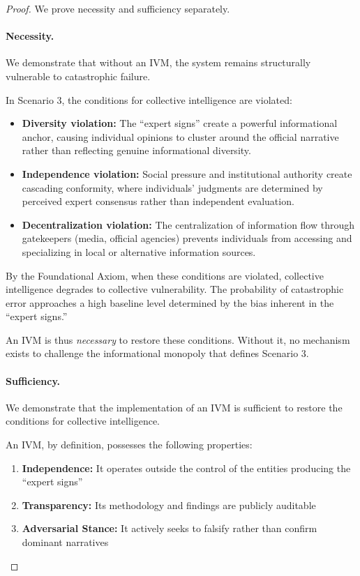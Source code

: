 \documentclass[11pt,a4paper]{article}
\begin{document}
\begin{proof}
We prove necessity and sufficiency separately.

\paragraph{Necessity.} We demonstrate that without an IVM, the system remains structurally vulnerable to catastrophic failure.

In Scenario 3, the conditions for collective intelligence are violated:
\begin{itemize}
    \item \textbf{Diversity violation:} The ``expert signs'' create a powerful informational anchor, causing individual opinions to cluster around the official narrative rather than reflecting genuine informational diversity.
    \item \textbf{Independence violation:} Social pressure and institutional authority create cascading conformity, where individuals' judgments are determined by perceived expert consensus rather than independent evaluation.
    \item \textbf{Decentralization violation:} The centralization of information flow through gatekeepers (media, official agencies) prevents individuals from accessing and specializing in local or alternative information sources.
\end{itemize}

By the Foundational Axiom, when these conditions are violated, collective intelligence degrades to collective vulnerability. The probability of catastrophic error approaches a high baseline level determined by the bias inherent in the ``expert signs.''

An IVM is thus \textit{necessary} to restore these conditions. Without it, no mechanism exists to challenge the informational monopoly that defines Scenario 3.

\paragraph{Sufficiency.} We demonstrate that the implementation of an IVM is sufficient to restore the conditions for collective intelligence.

An IVM, by definition, possesses the following properties:
\begin{enumerate}
    \item \textbf{Independence:} It operates outside the control of the entities producing the ``expert signs''
    \item \textbf{Transparency:} Its methodology and findings are publicly auditable
    \item \textbf{Adversarial Stance:} It actively seeks to falsify rather than confirm dominant narratives
\end{enumerate}


\end{proof}
\end{document}
